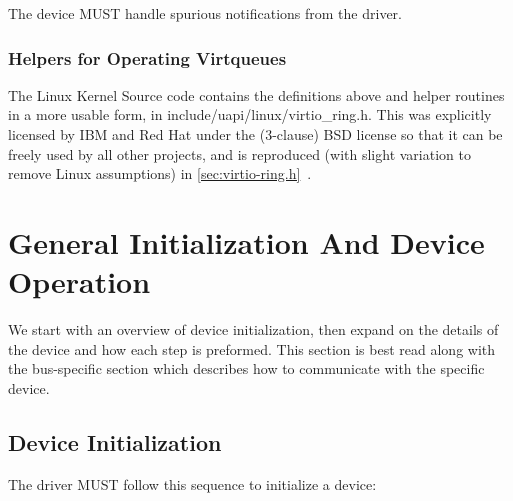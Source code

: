 The device MUST handle spurious notifications from the driver.

\subsection{Helpers for Operating Virtqueues}\label{sec:Basic Facilities of a Virtio Device / Virtqueues / Helpers for Operating Virtqueues}

The Linux Kernel Source code contains the definitions above and
helper routines in a more usable form, in
include/uapi/linux/virtio_ring.h. This was explicitly licensed by IBM
and Red Hat under the (3-clause) BSD license so that it can be
freely used by all other projects, and is reproduced (with slight
variation to remove Linux assumptions) in \ref{sec:virtio-ring.h}~.

\chapter{General Initialization And Device Operation}\label{sec:General Initialization And Device Operation}

We start with an overview of device initialization, then expand on the
details of the device and how each step is preformed.  This section
is best read along with the bus-specific section which describes
how to communicate with the specific device.

\section{Device Initialization}\label{sec:General Initialization And Device Operation / Device Initialization}

The driver MUST follow this sequence to initialize a device:

